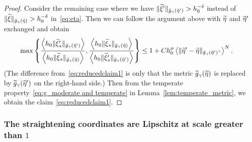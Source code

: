 \documentclass[AHL,Unicode,longabstracts,published]{cedram}
\let\oldtilde\tilde
\renewcommand*{\tilde}[1]{\mathchoice{\widetilde{#1}}{\widetilde{#1}}{\oldtilde{#1}}{\oldtilde{#1}}}
\begin{document}
\begin{proof}
Consider the remaining case where we have $\|\tilde{\xi}'\|_{\tilde{g}_{\gamma}(\tilde{\eta}')}>h_{0}^{-\delta}$ instead of $\|\tilde{\xi}\|_{\tilde{g}_{\gamma}(\tilde{\eta})}\linebreak >h_{0}^{-\delta}$ in~\eqref{eq:eta}. Then we can follow the argument above with $\tilde{\eta}$ and $\tilde{\eta}'$ exchanged and obtain
\begin{equation}\label{eq:reducedclaim2}
\max\left\{ \frac{\left\langle h_{0}\|\tilde{\xi}'_{s}\|_{\tilde{g}_{\gamma}\left(\tilde{\eta}'\right)}\right\rangle}{\left\langle h_{0}\|\tilde{\xi}_{s}\|_{\tilde{g}_{\gamma}\left(\tilde{\eta}\right)}\right\rangle},\frac{\left\langle h_{0}\|\tilde{\xi}_{s}\|_{\tilde{g}_{\gamma}\left(\tilde{\eta}\right)}\right\rangle}{\left\langle h_{0}\|\tilde{\xi}'_{s}\|_{\tilde{g}_{\gamma}\left(\tilde{\eta}'\right)}\right\rangle}\right\} \le1+Ch_{0}^{\mu}\left\langle\|\tilde{\eta}'-\tilde{\eta}\|_{\tilde{g}_{\gamma}\left(\tilde{\eta}'\right)^{\gamma}}\right\rangle^{N}.
\end{equation}
(The difference from~\eqref{eq:reducedclaim1} is only that the metric $\tilde{g}_{\gamma}(\tilde{\eta})$ is replaced by $\tilde{g}_{\gamma}(\tilde{\eta}')$ on the right-hand side.) Then from the temperate property~\eqref{eq:g_moderate and temperate} in Lemma~\ref{lem:temperate_metric}, we obtain the claim~\eqref{eq:reducedclaim1}.
\end{proof}

\subsubsection{The straightening coordinates are Lipschitz at scale greater than \texorpdfstring{$1$}{1}}
\end{document}
